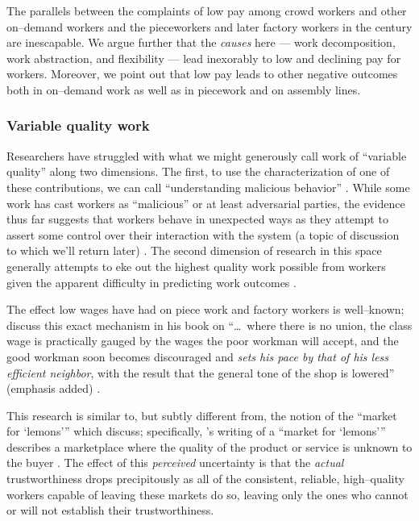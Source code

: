 \documentclass[trackingWork]{subfiles}
\begin{document}
{The parallels between the complaints of low pay among crowd workers and other on--demand workers
and the pieceworkers and later factory workers in the  century
are inescapable.
We argue further that the \textit{causes} here
--- work decomposition,
work abstraction, and
flexibility ---
lead inexorably to low and declining pay for workers.
Moreover, we point out that low pay leads to other negative outcomes both
in on--demand work
as well as
in piecework and on assembly lines.

\subsubsection{Variable quality work}\label{sec:varQualWork}
Researchers have struggled with what we might generously call work of ``variable quality''
along two dimensions.
The first, to use the characterization of one of these contributions, we can call
``understanding malicious behavior''
\cite{MaliciousCrowdworkersGadiraju}.
While some work has cast workers as ``malicious'' or at least adversarial parties,
the evidence thus far suggests that
workers behave in unexpected ways as they attempt to assert some control over their interaction with the system
(a topic of discussion to which we'll return later)
\cite{uberAlgorithm}.
The second dimension of research in this space generally attempts
to eke out the highest quality work possible from workers
given the apparent difficulty in predicting work outcomes
\cite{embracingErrorKrishna}.






The effect low wages have had on piece work and factory workers is well--known;
\citeauthor{gantt1913work} discuss this exact mechanism in his book on
``\dots~where there is no union,
the class wage is practically gauged by the wages the poor workman will accept,
and the good workman soon becomes discouraged and \textit{sets his pace by that of his less efficient neighbor},
with the result that the general tone of the shop is lowered'' (emphasis added)
\cite{gantt1913work}.

This research is similar to, but subtly different from, the notion of the ``market for `lemons'''
which \citeauthor{fort2011amazon} discuss;
specifically, \citeauthor{akerlof1970market}'s writing of a ``market for `lemons'''
describes a marketplace where the quality of the product or service is unknown to the buyer
\cite{fort2011amazon,akerlof1970market}.
The effect of this \textit{perceived} uncertainty is that
the \textit{actual} trustworthiness drops precipitously
as all of the consistent, reliable, high--quality workers capable of leaving these markets do so,
leaving only the ones who cannot or will not establish their trustworthiness.

}
\end{document}
